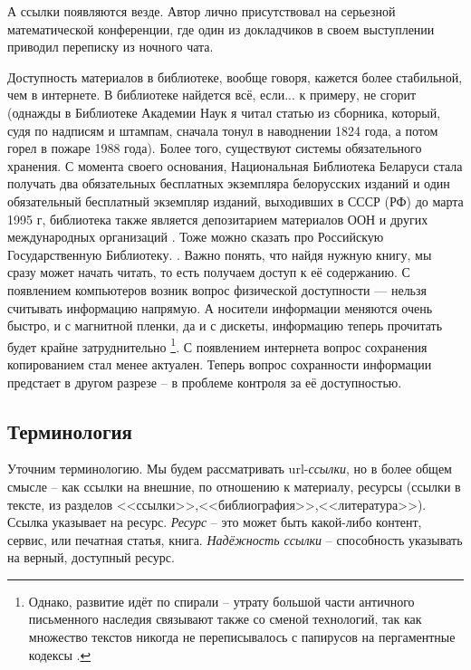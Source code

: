\documentclass[10pt, a5paper]{article}
\begin{document}
А  ссылки  появляются  везде.  Автор  лично  присутствовал   на
серьезной математической конференции,  где  один  из  докладчиков  в
своем выступлении приводил переписку из  ночного  чата.

Доступность материалов  в  библиотеке,  вообще  говоря,  кажется
более стабильной,  чем  в  интернете.  В  библиотеке найдется всё,
если... к примеру, не сгорит (однажды в Библиотеке Академии  Наук 
\cite{AY2}
я читал статью из сборника, который, судя  по  надписям  и  штампам,
сначала тонул в наводнении 1824 года, а потом горел  в  пожаре  1988
года). Более того,  существуют  системы  обязательного  хранения. 
С момента своего основания, Национальная Библиотека Беларуси
стала получать два обязательных бесплатных экземпляра белорусских 
изданий и один обязательный бесплатный экземпляр изданий, 
выходивших в СССР (РФ) до марта 1995 г, библиотека также является 
депозитарием материалов ООН и других 
международных организаций \cite{AY3}. Тоже можно сказать про 
Российскую    Государственную    Библиотеку. \cite{AY4}. 
Важно  понять,  что
найдя нужную книгу, мы сразу может начать читать, то  есть  получаем
доступ к её содержанию.
    С появлением компьютеров возник вопрос физической доступности  —
нельзя  считывать  информацию  напрямую.   А   носители   информации
меняются очень быстро,  и  с  магнитной  пленки,  да  и  с  дискеты,
информацию  теперь  прочитать  будет   крайне   затруднительно
\footnote{Однако, развитие идёт по спирали – утрату большой части
античного письменного наследия связывают также со сменой
технологий, так как множество текстов никогда не переписывалось с
папирусов на пергаментные кодексы \cite{AY5}.}. 
С появлением  интернета  вопрос  сохранения  копированием  стал  менее
актуален. Теперь вопрос сохранности информации  предстает  в  другом
разрезе -- в проблеме контроля за её доступностью.

\subsection*{Терминология}

Уточним терминологию. Мы будем рассматривать url-\textit{ссылки}, но в  более
общем смысле – как  ссылки  на  внешние,  по  отношению  к  материалу,
ресурсы       (ссылки       в       тексте,       из        разделов
<<ссылки>>,<<библиография>>,<<литература>>). Ссылка указывает  на  ресурс.
\textit{Ресурс} – это может быть какой-либо  контент,  сервис,  или  печатная
статья, книга. 
\textit{Надёжность ссылки} – способность указывать на верный, доступный 
ресурс.  
\end{document}
